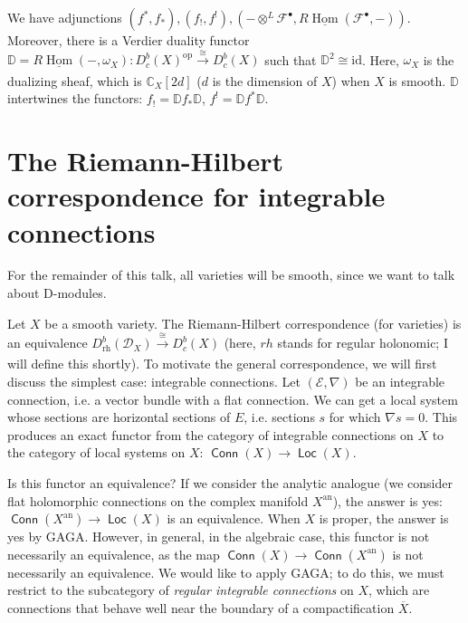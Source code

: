 \documentclass[leqno, openany]{memoir}
\theoremstyle{definition}
\theoremstyle{remark}
\theoremstyle{plain}
\theoremstyle{definition}
\theoremstyle{remark}
\newcommand{\mc}[1]{\mathcal{#1}}
\newcommand{\mr}[1]{\mathrm{#1}}
\newcommand{\ms}[1]{\mathsf{#1}}
\newcommand{\ul}[1]{\underline{#1}}
\DeclareMathOperator{\Hom}{Hom}
\DeclareMathOperator{\Conn}{\ms{Conn}}
\DeclareMathOperator{\Loc}{\ms{Loc}}
\begin{document}
We have adjunctions $(f^*,f_*),(f_!,f^!),(- \otimes^L \mathcal{F}^{\bullet},R\ul{\Hom}(\mathcal{F}^{\bullet},-))$. Moreover, there is a Verdier duality functor $\mathbb{D} = R\ul{\Hom}(-,\omega_X): D_c^b(X)^{\mr{op}} \xrightarrow[]{\cong} D_c^b(X)$ such that $\mathbb{D}^2 \cong \mr{id}$. Here, $\omega_X$ is the dualizing sheaf, which is $\mathbb{C}_X[2d]$ ($d$ is the dimension of $X$) when $X$ is smooth. $\mathbb{D}$ intertwines the functors: $f_! = \mathbb{D}f_*\mathbb{D}$, $f^! = \mathbb{D}f^*\mathbb{D}$.

\section{The Riemann-Hilbert correspondence for integrable connections}
For the remainder of this talk, all varieties will be smooth, since we want to talk about D-modules.

Let $X$ be a smooth variety. The Riemann-Hilbert correspondence (for varieties) is an equivalence $D_{\mr{rh}}^b(\mc{D}_X) \xrightarrow[]{\cong} D_c^b(X)$ (here, $rh$ stands for regular holonomic; I will define this shortly). To motivate the general correspondence, we will first discuss the simplest case: integrable connections. Let $(\mathcal{E},\nabla)$ be an integrable connection, i.e. a vector bundle with a flat connection. We can get a local system whose sections are horizontal sections of $E$, i.e. sections $s$ for which $\nabla s = 0$. This produces an exact functor from the category of integrable connections on $X$ to the category of local systems on $X$: $\Conn(X) \to \Loc(X)$.

Is this functor an equivalence? If we consider the analytic analogue (we consider flat holomorphic connections on the complex manifold $X^{\mr{an}}$), the answer is yes: $\Conn(X^{\mr{an}}) \to \Loc(X)$ is an equivalence. When $X$ is proper, the answer is yes by GAGA. However, in general, in the algebraic case, this functor is not necessarily an equivalence, as the map $\Conn(X) \to \Conn(X^{\mr{an}})$ is not necessarily an equivalence. We would like to apply GAGA; to do this, we must restrict to the subcategory of \textit{regular integrable connections} on $X$, which are connections that behave well near the boundary of a compactification $\overline{X}$.
\end{document}
